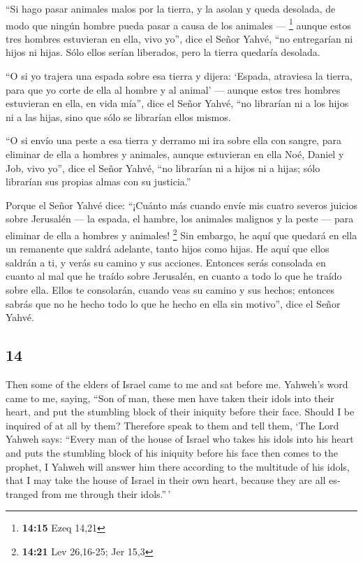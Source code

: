 \begin{paracol}{2}
 ``Si hago pasar animales malos por la tierra, y la
asolan y queda desolada, de modo que ningún hombre pueda pasar a causa
de los animales --- \footnote{\textbf{14:15} Ezeq 14,21} 
aunque estos tres hombres estuvieran en ella, vivo yo'', dice el Señor
Yahvé, ``no entregarían ni hijos ni hijas. Sólo ellos serían liberados,
pero la tierra quedaría desolada.

 ``O si yo trajera una espada sobre esa tierra y dijera:
`Espada, atraviesa la tierra, para que yo corte de ella al hombre y al
animal' ---  aunque estos tres hombres estuvieran en
ella, en vida mía'', dice el Señor Yahvé, ``no librarían ni a los hijos
ni a las hijas, sino que sólo se librarían ellos mismos.

 ``O si envío una peste a esa tierra y derramo mi ira
sobre ella con sangre, para eliminar de ella a hombres y animales,
 aunque estuvieran en ella Noé, Daniel y Job, vivo yo'',
dice el Señor Yahvé, ``no librarían ni a hijos ni a hijas; sólo
librarían sus propias almas con su justicia.''

 Porque el Señor Yahvé dice: ``¡Cuánto más cuando envíe
mis cuatro severos juicios sobre Jerusalén --- la espada, el hambre, los
animales malignos y la peste --- para eliminar de ella a hombres y
animales! \footnote{\textbf{14:21} Lev 26,16-25; Jer 15,3}
 Sin embargo, he aquí que quedará en ella un remanente
que saldrá adelante, tanto hijos como hijas. He aquí que ellos saldrán a
ti, y verás su camino y sus acciones. Entonces serás consolada en cuanto
al mal que he traído sobre Jerusalén, en cuanto a todo lo que he traído
sobre ella.  Ellos te consolarán, cuando veas su camino y
sus hechos; entonces sabrás que no he hecho todo lo que he hecho en ella
sin motivo'', dice el Señor Yahvé.

\switchcolumn
\begin{otherlanguage}{english}

\hypertarget{section-27}{%
\section{14}\label{section-27}}

 Then some of the elders of Israel came to me and sat
before me.  Yahweh's word came to me, saying,
 ``Son of man, these men have taken their idols into their
heart, and put the stumbling block of their iniquity before their face.
Should I be inquired of at all by them?  Therefore speak
to them and tell them, `The Lord Yahweh says: ``Every man of the house
of Israel who takes his idols into his heart and puts the stumbling
block of his iniquity before his face then comes to the prophet, I
Yahweh will answer him there according to the multitude of his idols,
 that I may take the house of Israel in their own heart,
because they are all estranged from me through their idols.''\,'


\end{otherlanguage}
\end{paracol}
